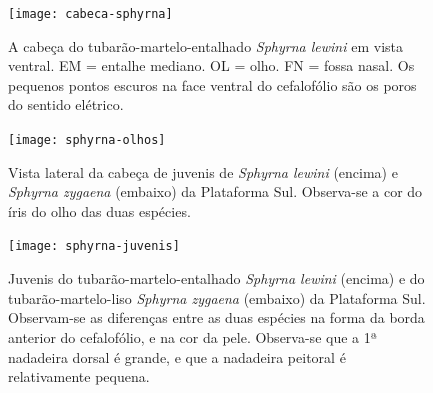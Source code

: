 \documentclass[a4paper,11pt,twoside,showtrims,onecolumn,openright,final]{memoir}
\begin{document}
%
%

\begin{figure}
\begin{center}
\texttt{[image: cabeca-sphyrna]}
\end{center}
\caption[A cabeça do tubarão-martelo-entalhado  \emph{Sphyrna lewini}  em vista ventral]
	{A cabeça do tubarão-martelo-entalhado  \emph{Sphyrna lewini}  em vista ventral. 
         EM = entalhe mediano. OL = olho. FN = fossa nasal. Os pequenos pontos escuros 
         na face ventral do cefalofólio são os poros do sentido elétrico.}
\label{fig:lewini-cabeca}
\end{figure}


%
%

\begin{figure}
\begin{center}
\texttt{[image: sphyrna-olhos]}
\end{center}
\caption[Vista lateral da cabeça de juvenis de \emph{Sphyrna lewini} e \emph{Sphyrna zygaena}]
	{Vista lateral da cabeça de juvenis de \emph{Sphyrna lewini} (encima) e \emph{Sphyrna zygaena} (embaixo) 
         da Plataforma Sul. Observa-se a cor do íris do olho das duas espécies.}
\label{fig:martelos-olhos}
\end{figure}



%
%

\begin{figure}
\begin{center}
\texttt{[image: sphyrna-juvenis]}
\end{center}
\caption[Juvenis do tubarão-martelo-entalhado  \emph{Sphyrna lewini} 
         e do tubarão-martelo-liso \emph{Sphyrna zygaena}.]
	{Juvenis do tubarão-martelo-entalhado  \emph{Sphyrna lewini} (encima) 
         e do tubarão-martelo-liso \emph{Sphyrna zygaena} (embaixo) da Plataforma Sul.
         Observam-se as diferenças entre as duas espécies na  forma da borda anterior do cefalofólio, 
         e na cor da pele. Observa-se que a 1ª nadadeira dorsal é grande, e que a nadadeira peitoral 
         é relativamente pequena.}
\label{fig:martelos-nadadeiras}
\end{figure}
\end{document}
